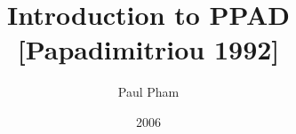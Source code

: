 \documentclass[10pt]{beamer}
\title{Introduction to PPAD [Papadimitriou 1992]}
\author[P. Pham]{Paul Pham}
\institute{UW CSE}
\date{2006}
\begin{document}
\begin{frame}
\begin{figure}[hbt]
  
  \centerline{\box\graph}
  \label{qcirc:fig}
\end{figure}
\end{frame}
\end{document}
